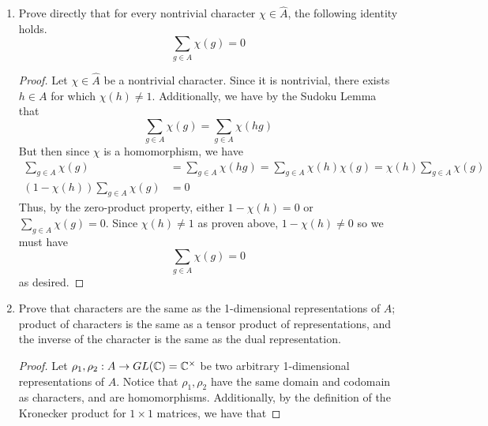 \documentclass[../psets.tex]{subfiles}
\begin{document}
\begin{enumerate}
\begin{enumerate}
\begin{proof}
            \begin{equation*}
                \chi_1\chi_2(g) = \chi_1(g)\cdot\chi_2(g)
                = \chi_2(g)\cdot\chi_1(g)
                = \chi_2\chi_1(g)
            \end{equation*}
        \end{proof}
        \item Prove directly that for every nontrivial character $\chi\in\widehat{A}$, the following identity holds.
        \begin{equation*}
            \sum_{g\in A}\chi(g) = 0
        \end{equation*}
        \begin{proof}

            Let $\chi\in\widehat{A}$ be a nontrivial character. Since it is nontrivial, there exists $h\in A$ for which $\chi(h)\neq 1$. Additionally, we have by the Sudoku Lemma that
            \begin{equation*}
                \sum_{g\in A}\chi(g) = \sum_{g\in A}\chi(hg)
            \end{equation*}
            But then since $\chi$ is a homomorphism, we have
            \begin{align*}
                \sum_{g\in A}\chi(g) &= \sum_{g\in A}\chi(hg)
                    = \sum_{g\in A}\chi(h)\chi(g)
                    = \chi(h)\sum_{g\in A}\chi(g)\\
                (1-\chi(h))\sum_{g\in A}\chi(g) &= 0
            \end{align*}
            Thus, by the zero-product property, either $1-\chi(h)=0$ or $\sum_{g\in A}\chi(g)=0$. Since $\chi(h)\neq 1$ as proven above, $1-\chi(h)\neq 0$ so we must have
            \begin{equation*}
                \sum_{g\in A}\chi(g) = 0
            \end{equation*}
            as desired.
        \end{proof}
        \item Prove that characters are the same as the 1-dimensional representations of $A$; product of characters is the same as a tensor product of representations, and the inverse of the character is the same as the dual representation.
        \begin{proof}
            Let $\rho_1,\rho_2:A\to GL(\mathbb{C})=\mathbb{C}^\times$ be two arbitrary 1-dimensional representations of $A$. Notice that $\rho_1,\rho_2$ have the same domain and codomain as characters, and are homomorphisms. Additionally, by the definition of the Kronecker product for $1\times 1$ matrices, we have that

\end{proof}
\end{enumerate}
\end{enumerate}
\end{document}
